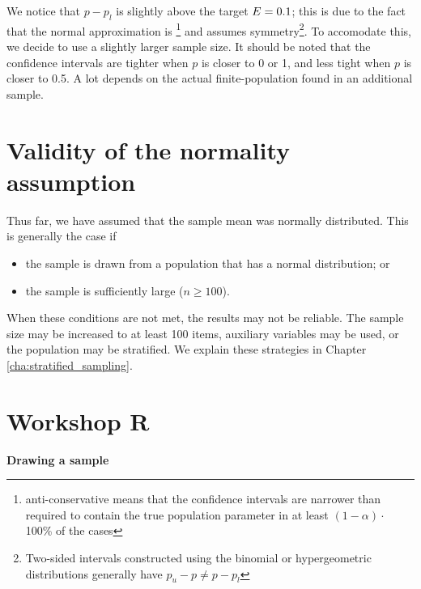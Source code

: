 We notice that  $p-p_l$ is slightly above the target $E = \EstPropTargetPrecision$; this is due to the fact that the normal approximation is \footnote{anti-conservative means that the confidence intervals are narrower than required to contain the true population parameter in at least $(1 - \alpha) \cdot$ 100\% of the cases} and assumes symmetry\footnote{Two-sided intervals constructed using the binomial or hypergeometric distributions generally have $p_u - p \neq p - p_l$}. To accomodate this, we decide to use a slightly larger sample size. It should be noted that the confidence intervals are tighter when $p$ is closer to 0 or 1, and less tight when $p$ is closer to 0.5. A lot depends on the actual finite-population found in an additional sample.


\section{Validity of the normality assumption} %
\label{sec:validity_of_the_normality_assumption}

Thus far, we have assumed that the sample mean was normally distributed. This is generally the case if
\begin{itemize}
\item the sample is drawn from a population that has a normal distribution; or
\item the sample is sufficiently large  ($n \geq 100$).
\end{itemize}

When these conditions are not met, the results may not be reliable. The sample size may be increased to at least 100 items, auxiliary variables may be used, or the population may be stratified. We explain these strategies in Chapter \ref{cha:stratified_sampling}.


\section{Workshop R} %
\label{sec:workshop03}

\begin{exercise}
\label{ex:drawing_a_sample}

\textbf{Drawing a sample}




\end{exercise}

